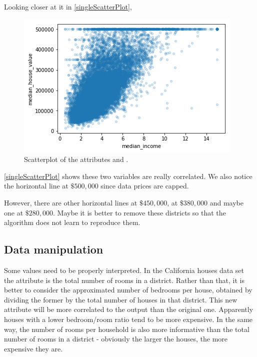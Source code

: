 Looking closer at it in \autoref{singleScatterPlot},
\begin{figure}
\centering
\includegraphics[scale=0.8]{img/singleScatterPlot}
\caption{Scatterplot of the attributes  and .}
\label{singleScatterPlot}
\end{figure}

\autoref{singleScatterPlot} shows these two variables are really correlated. We also notice the horizontal line at $\$500,000$ since data prices are capped.

However, there are other horizontal lines at $\$450,000$, at $\$380,000$ and maybe one at $\$280,000$. Maybe it is better to remove these districts so that the algorithm does not learn to reproduce them.

\subsection{Data manipulation}
Some values need to be properly interpreted. In the California houses data set the attribute  is the total number of rooms in a district. Rather than that, it is better to consider the approximated number of bedrooms per house, obtained by dividing the former by the total number of houses in that district. This new attribute will be more correlated to the output than the original one. Apparently houses with a lower bedroom/room ratio tend to be more expensive. 
In the same way, the number of rooms per household is also more informative than the total number of rooms in a district - obviously the larger the houses, the more expensive they are.

